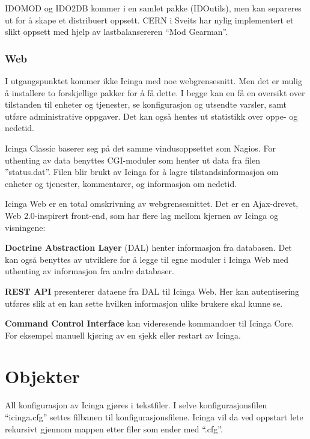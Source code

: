 IDOMOD og IDO2DB kommer i en samlet pakke (IDOutils), men kan separeres ut for å skape et distribuert oppsett. CERN i Sveits har nylig implementert et slikt oppsett med hjelp av lastbalansereren ``Mod Gearman''\cite{cernthesis}.

\subsubsection{Web}\label{sec:teoriweb}
I utgangspunktet kommer ikke Icinga med noe webgrensesnitt. Men det er mulig å installere to forskjellige pakker for å få dette. I begge kan en få en oversikt over tilstanden til enheter og tjenester, se konfigurasjon og utsendte varsler, samt utføre administrative oppgaver. Det kan også hentes ut statistikk over oppe- og nedetid.

Icinga Classic baserer seg på det samme vindusoppsettet som Nagios. For uthenting av data benyttes CGI-moduler som henter ut data fra filen ''status.dat''. Filen blir brukt av Icinga for å lagre tilstandsinformasjon om enheter og tjenester, kommentarer, og informasjon om nedetid. 

Icinga Web er en total omskrivning av webgrensesnittet. Det er en Ajax-drevet, Web 2.0-inspirert front-end, som har flere lag mellom kjernen av Icinga og visningene:
\begin{itemize*}
\item \textbf{Doctrine Abstraction Layer} (DAL) henter informasjon fra databasen. Det kan også benyttes av utviklere for å legge til egne moduler i Icinga Web med uthenting av informasjon fra andre databaser.
\item \textbf{REST API} presenterer dataene fra DAL til Icinga Web. Her kan autentisering utføres slik at en kan sette hvilken informasjon ulike brukere skal kunne se.
\item \textbf{Command Control Interface} kan videresende kommandoer til Icinga Core. For eksempel manuell kjøring av en sjekk eller restart av Icinga.
\end{itemize*}

\section{Objekter}\label{sec:objekter}
All konfigurasjon av Icinga gjøres i tekstfiler. I selve konfigurasjonsfilen ``icinga.cfg'' settes filbanen til konfigurasjonsfilene. Icinga vil da ved oppstart lete rekursivt gjennom mappen etter filer som ender med ``.cfg''.

